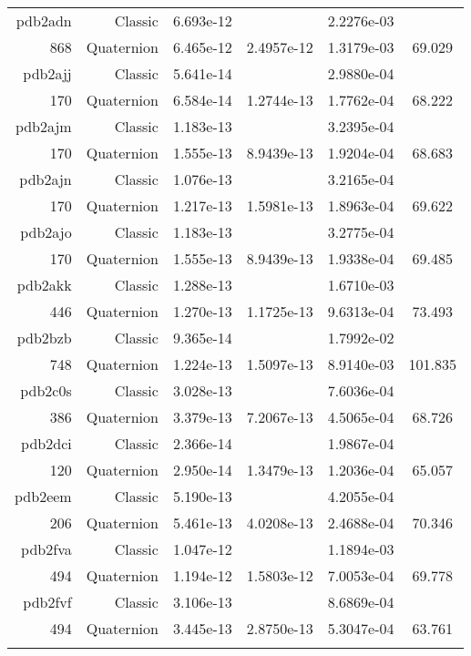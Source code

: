 \begin{xltabular}{\textwidth}{r|rS[table-format=1.3e+2]S[table-format=1.4e+2]S[table-format=1.4e+2]S[table-format=-1.3]}
pdb2adn & Classic & 6.693e-12 &  & 2.2276e-03 & \\
868 & Quaternion & 6.465e-12 & 2.4957e-12 & 1.3179e-03 & 69.029\\  \addlinespace
pdb2ajj & Classic & 5.641e-14 &  & 2.9880e-04 & \\
170 & Quaternion & 6.584e-14 & 1.2744e-13 & 1.7762e-04 & 68.222\\  \addlinespace
pdb2ajm & Classic & 1.183e-13 &  & 3.2395e-04 & \\
170 & Quaternion & 1.555e-13 & 8.9439e-13 & 1.9204e-04 & 68.683\\  \addlinespace
pdb2ajn & Classic & 1.076e-13 &  & 3.2165e-04 & \\
170 & Quaternion & 1.217e-13 & 1.5981e-13 & 1.8963e-04 & 69.622\\  \addlinespace
pdb2ajo & Classic & 1.183e-13 &  & 3.2775e-04 & \\
170 & Quaternion & 1.555e-13 & 8.9439e-13 & 1.9338e-04 & 69.485\\  \addlinespace
pdb2akk & Classic & 1.288e-13 &  & 1.6710e-03 & \\
446 & Quaternion & 1.270e-13 & 1.1725e-13 & 9.6313e-04 & 73.493\\  \addlinespace
pdb2bzb & Classic & 9.365e-14 &  & 1.7992e-02 & \\
748 & Quaternion & 1.224e-13 & 1.5097e-13 & 8.9140e-03 & 101.835\\  \addlinespace
pdb2c0s & Classic & 3.028e-13 &  & 7.6036e-04 & \\
386 & Quaternion & 3.379e-13 & 7.2067e-13 & 4.5065e-04 & 68.726\\  \addlinespace
pdb2dci & Classic & 2.366e-14 &  & 1.9867e-04 & \\
120 & Quaternion & 2.950e-14 & 1.3479e-13 & 1.2036e-04 & 65.057\\  \addlinespace
pdb2eem & Classic & 5.190e-13 &  & 4.2055e-04 & \\
206 & Quaternion & 5.461e-13 & 4.0208e-13 & 2.4688e-04 & 70.346\\  \addlinespace
pdb2fva & Classic & 1.047e-12 &  & 1.1894e-03 & \\
494 & Quaternion & 1.194e-12 & 1.5803e-12 & 7.0053e-04 & 69.778\\  \addlinespace
pdb2fvf & Classic & 3.106e-13 &  & 8.6869e-04 & \\
494 & Quaternion & 3.445e-13 & 2.8750e-13 & 5.3047e-04 & 63.761\\  \addlinespace

\end{xltabular}
